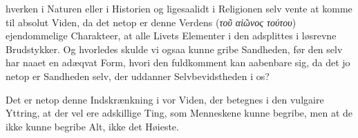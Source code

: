 \documentclass[12pt]{book}
\begin{document}
hverken i Naturen eller i Historien og ligesaalidt i Religionen selv vente at
komme til absolut Viden, da det netop er denne Verdens (\textit{τοῦ αἰῶνος
τούτου}) ejendommelige Charakteer, at alle Livets Elementer i den adsplittes i
løsrevne Brudstykker. Og hvorledes skulde vi ogsaa kunne gribe Sandheden, før
den selv har naaet en adæqvat Form, hvori den fuldkomment kan aabenbare sig, da
det jo netop er Sandheden selv, der uddanner Selvbevidstheden i os?

Det er netop denne Indskrænkning i vor Viden, der betegnes i den vulgaire
Yttring, at der vel ere adskillige Ting, som Menneskene kunne begribe, men at
de ikke kunne begribe Alt, ikke det Høieste.
\end{document}
